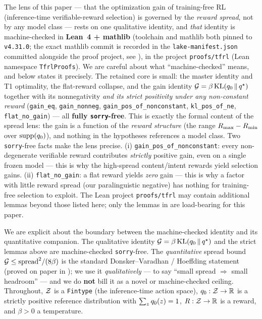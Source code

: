 The lens of this paper --- that the optimization gain of training-free RL (inference-time
verifiable-reward selection) is governed by the \emph{reward spread}, not by any model class --- rests
on one qualitative identity, and \emph{that} identity is machine-checked in \textbf{Lean~4 + mathlib}
(toolchain and mathlib both pinned to \texttt{v4.31.0}; the exact mathlib commit is recorded in the
\texttt{lake-manifest.json} committed alongside the proof project, see ), in the
project \texttt{proofs/tfrl} (Lean namespace \texttt{TfrlProofs}). We are careful about what
``machine-checked'' means, and  below states it precisely. The retained core is
small: the master identity and T1 optimality, the flat-reward collapse, and the gain identity
$\mathcal{G}=\beta\,\mathrm{KL}\!\left(q_{0} \,\|\, q^{\star}\right)$ together with its nonnegativity \emph{and its strict positivity under any
non-constant reward} (\texttt{gain\_eq}, \texttt{gain\_nonneg}, \texttt{gain\_pos\_of\_nonconstant},
\texttt{kl\_pos\_of\_ne}, \texttt{flat\_no\_gain}) --- all \textbf{fully \texttt{sorry}-free}. This is
exactly the formal content of the spread lens: the gain is a function of the \emph{reward structure}
(the range $R_{\max}-R_{\min}$ over $\operatorname{supp}(q_{0})$), and nothing in the hypotheses
references a model class. Two \texttt{sorry}-free facts make the lens precise. (i)
\texttt{gain\_pos\_of\_nonconstant}: every non-degenerate verifiable reward contributes \emph{strictly}
positive gain, even on a single frozen model --- this is why the high-spread content/intent rewards
yield selection gains. (ii) \texttt{flat\_no\_gain}: a flat reward yields \emph{zero} gain --- this is
why a factor with little reward spread (our paralinguistic negative) has nothing for training-free
selection to exploit. The Lean project \texttt{proofs/tfrl} may contain additional lemmas beyond those
listed here; only the lemmas in  are load-bearing for this paper.

We are explicit about the boundary between the machine-checked identity and its quantitative
companion. The qualitative identity $\mathcal{G}=\beta\,\mathrm{KL}\!\left(q_{0} \,\|\, q^{\star}\right)$ and the strict lemmas above are
machine-checked \texttt{sorry}-free. The \emph{quantitative} spread bound $\mathcal{G}\le\mathrm{spread}^2/(8\beta)$
is the standard Donsker--Varadhan / Hoeffding statement (proved on paper in );
we use it \emph{qualitatively} --- to say ``small spread $\Rightarrow$ small headroom'' --- and we do
\textbf{not} bill it as a novel or machine-checked ceiling. Throughout, $\mathcal{Z}$ is a \texttt{Fintype}
(the inference-time action space), $q_{0}:\mathcal{Z}\to\mathbb{R}$ is a strictly positive reference distribution with
$\sum_z q_{0}(z)=1$, $R:\mathcal{Z}\to\mathbb{R}$ is a reward, and $\beta>0$ a temperature.

